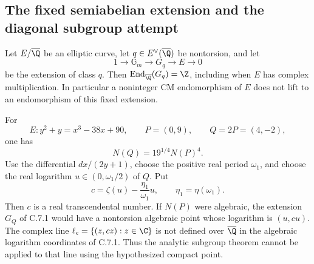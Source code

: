 \subsection{The fixed semiabelian extension and the diagonal subgroup attempt}

\begin{proposition}\label{ari:C.7.9}
Let $E/\overline\Q$ be an elliptic curve, let
$q\in E^\vee(\overline\Q)$ be nontorsion, and let
\[
 1\longrightarrow\mathbb G_m\longrightarrow G_q
       \longrightarrow E\longrightarrow0
\]
be the extension of class $q$. Then
$\operatorname{End}_{\overline\Q}(G_q)=\Z$, including when
$E$ has complex multiplication. In particular a noninteger
CM endomorphism of $E$ does not lift to an endomorphism of this
fixed extension.

For
\[
 E:y^2+y=x^3-38x+90,\qquad P=(0,9),\qquad Q=2P=(4,-2),
\]
one has
\[
 N(Q)=19^{1/4}N(P)^4.
\]
Use the differential $dx/(2y+1)$, choose the positive real
period $\omega_1$, and choose the real logarithm
$u\in(0,\omega_1/2)$ of $Q$. Put
\begin{equation}\label{ari:eq:cd-slope}
 c=\zeta(u)-\frac{\eta_1}{\omega_1}u,
 \qquad \eta_1=\eta(\omega_1).
\end{equation}
Then $c$ is a real transcendental number. If $N(P)$ were
algebraic, the extension $G_Q$ of C.7.1 would have a
nontorsion algebraic point whose logarithm is $(u,cu)$.
The complex line
$\ell_c=\{(z,cz):z\in\C\}$ is not defined over
$\overline\Q$ in the algebraic logarithm coordinates of
C.7.1. Thus the analytic subgroup theorem cannot be applied
to that line using the hypothesized compact point.
\end{proposition}

